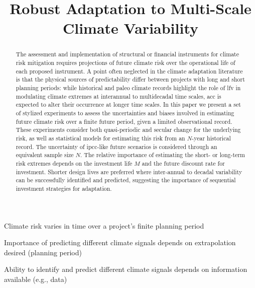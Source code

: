 \documentclass[
  draft,
  linenumbers
]{agujournal2018}
\makeatletter
\newcommand{\eg}{e.g.\@\xspace}
\makeatother
\begin{document}
\title{Robust Adaptation to Multi-Scale Climate Variability}

\begin{keypoints}
  \item Climate risk varies in time over a project's finite planning period
  \item Importance of predicting different climate signals depends on extrapolation desired (planning period)
  \item Ability to identify and predict different climate signals depends on information available (\eg, data)
\end{keypoints}

\begin{abstract}
  The assessment and implementation of structural or financial instruments for climate risk mitigation requires projections of future climate risk over the operational life of each proposed instrument.
  A point often neglected in the climate adaptation literature is that the physical sources of predictability differ between projects with long and short planning periods: while historical and paleo climate records highlight the role of \acrlong{lfv} in modulating climate extremes at interannual to multidecadal time scales, \acrlong{acc} is expected to alter their occurrence at longer time scales.
  In this paper we present a set of stylized experiments to assess the uncertainties and biases involved in estimating future climate risk over a finite future period, given a limited observational record.
  These experiments consider both quasi-periodic and secular change for the underlying risk, as well as statistical models for estimating this risk from an $N$-year historical record.
  The uncertainty of \acrshort{ipcc}-like future scenarios is considered through an equivalent sample size $N$. 
  The relative importance of estimating the short- or long-term risk extremes depends on the investment life $M$ and the future discount rate for investment.
  Shorter design lives are preferred where inter-annual to decadal variability can be successfully identified and predicted, suggesting the importance of sequential investment strategies for adaptation. 
\end{abstract}
\end{document}
